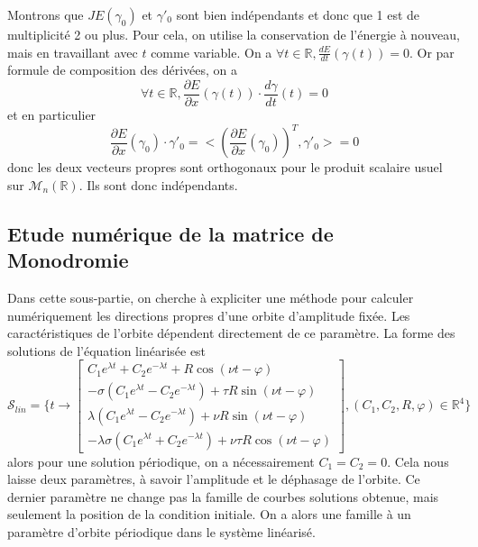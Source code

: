 \documentclass[12pt]{article}
\theoremstyle{definition}
\theoremstyle{definition}
\begin{document}
	Montrons que $JE(\gamma_0)$ et $\gamma'_0$ sont bien indépendants et donc que 1 est de multiplicité 2 ou plus. Pour cela, on utilise la conservation de l'énergie à nouveau, mais en travaillant avec $t$ comme variable. On a $\forall t \in \mathbb{R}, \frac{dE}{dt}(\gamma(t)) = 0$. Or par formule de composition des dérivées, on a
	\begin{equation}
		\forall t \in \mathbb{R}, \frac{\partial E}{\partial x}(\gamma(t)) \cdot \frac{d\gamma}{dt}(t) = 0
	\end{equation}
	et en particulier
	\begin{equation}
		\frac{\partial E}{\partial x}(\gamma_0) \cdot \gamma'_0 = <(\frac{\partial E}{\partial x}(\gamma_0))^T,\gamma'_0> = 0
	\end{equation}
	donc les deux vecteurs propres sont orthogonaux pour le produit scalaire usuel sur $\mathcal{M}_n(\mathbb{R})$. Ils sont donc indépendants.
	
	
	\subsection{Etude numérique de la matrice de Monodromie}
	Dans cette sous-partie, on cherche à expliciter une méthode pour calculer numériquement les directions propres d'une orbite d'amplitude fixée. Les caractéristiques de l'orbite dépendent directement de ce paramètre. La forme des solutions de l'équation linéarisée est
	\begin{equation}
		\mathcal{S}_{lin} = \{ t \to
		\begin{bmatrix}
			C_1e^{\lambda t} + C_2e^{-\lambda t} + R\cos(\nu t - \varphi)
			\\
			-\sigma (C_1e^{\lambda t} - C_2e^{-\lambda t}) +  \tau R\sin(\nu t - \varphi)
			\\
			\lambda (C_1e^{\lambda t} - C_2e^{-\lambda t}) + \nu R\sin(\nu t - \varphi)
			\\
			-\lambda\sigma (C_1e^{\lambda t} + C_2e^{-\lambda t}) + \nu\tau R\cos(\nu t - \varphi)
		\end{bmatrix},
		(C_1,C_2,R,\varphi) \in \mathbb{R}^4
		\}
	\end{equation}
	alors pour une solution périodique, on a nécessairement $C_1 = C_2 = 0$. Cela nous laisse deux paramètres, à savoir l'amplitude et le déphasage de l'orbite. Ce dernier paramètre ne change pas la famille de courbes solutions obtenue, mais seulement la position de la condition initiale. On a alors une famille à un paramètre d'orbite périodique dans le système linéarisé. 
	
\end{document}
